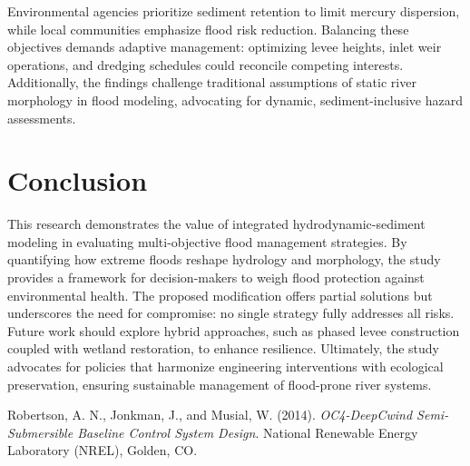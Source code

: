 \documentclass[a4paper, 11pt]{article}
\begin{document}
Environmental agencies prioritize sediment retention to limit mercury dispersion, while local communities emphasize flood risk reduction. Balancing these objectives demands adaptive management: optimizing levee heights, inlet weir operations, and dredging schedules could reconcile competing interests. Additionally, the findings challenge traditional assumptions of static river morphology in flood modeling, advocating for dynamic, sediment-inclusive hazard assessments.

\section{Conclusion}
\hspace*{0.5cm}This research demonstrates the value of integrated hydrodynamic-sediment modeling in evaluating multi-objective flood management strategies. By quantifying how extreme floods reshape hydrology and morphology, the study provides a framework for decision-makers to weigh flood protection against environmental health. The proposed modification offers partial solutions but underscores the need for compromise: no single strategy fully addresses all risks. Future work should explore hybrid approaches, such as phased levee construction coupled with wetland restoration, to enhance resilience. Ultimately, the study advocates for policies that harmonize engineering interventions with ecological preservation, ensuring sustainable management of flood-prone river systems.

\newpage
\begin{thebibliography}{99} 

 Robertson, A. N., Jonkman, J., and Musial, W. (2014). \textit{OC4-DeepCwind Semi-Submersible Baseline Control System Design}. National Renewable Energy Laboratory (NREL), Golden, CO.

\end{thebibliography}
\end{document}

